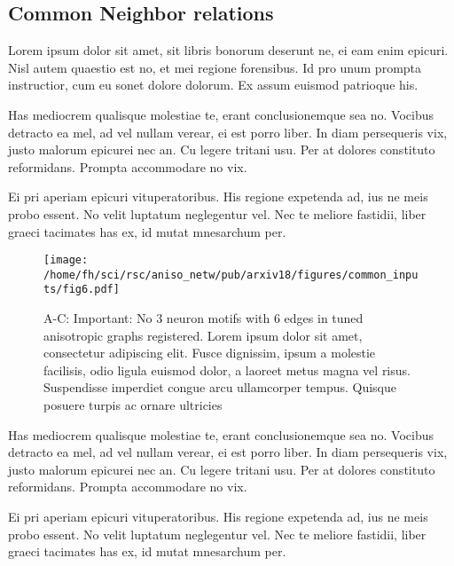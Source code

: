 \clearpage
\pagebreak
\newpage

\subsection*{Common Neighbor relations}

Lorem ipsum dolor sit amet, sit libris bonorum deserunt ne, ei eam enim epicuri. Nisl autem quaestio est no, et mei regione forensibus. Id pro unum prompta instructior, cum eu sonet dolore dolorum. Ex assum euismod patrioque his.

Has mediocrem qualisque molestiae te, erant conclusionemque sea no. Vocibus detracto ea mel, ad vel nullam verear, ei est porro liber. In diam persequeris vix, justo malorum epicurei nec an. Cu legere tritani usu. Per at dolores constituto reformidans. Prompta accommodare no vix.

Ei pri aperiam epicuri vituperatoribus. His regione expetenda ad, ius ne meis probo essent. No velit luptatum neglegentur vel. Nec te meliore fastidii, liber graeci tacimates has ex, id mutat mnesarchum per.

\begin{figure}[h!]
  \centering
  \texttt{[image: /home/fh/sci/rsc/aniso\_netw/pub/arxiv18/figures/common\_inputs/fig6.pdf]}
\caption{A-C: Important: No 3 neuron motifs with 6 edges in tuned anisotropic
graphs registered. Lorem ipsum dolor sit amet, consectetur adipiscing elit. Fusce dignissim, ipsum a molestie facilisis, odio ligula euismod dolor, a laoreet metus magna vel risus. Suspendisse imperdiet congue arcu ullamcorper tempus. Quisque posuere turpis ac ornare ultricies}
\label{fig:cnb}
\end{figure}

Has mediocrem qualisque molestiae te, erant conclusionemque sea no. Vocibus detracto ea mel, ad vel nullam verear, ei est porro liber. In diam persequeris vix, justo malorum epicurei nec an. Cu legere tritani usu. Per at dolores constituto reformidans. Prompta accommodare no vix.

Ei pri aperiam epicuri vituperatoribus. His regione expetenda ad, ius ne meis probo essent. No velit luptatum neglegentur vel. Nec te meliore fastidii, liber graeci tacimates has ex, id mutat mnesarchum per.
